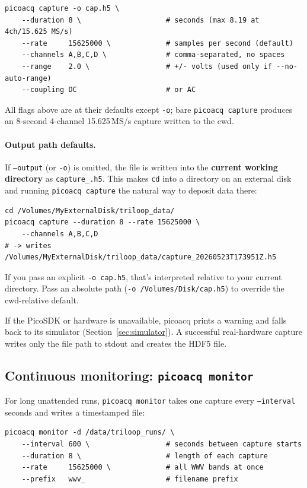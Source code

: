 \documentclass[11pt]{article}
\begin{document}
\begin{lstlisting}[style=shell]
picoacq capture -o cap.h5 \
    --duration 8 \                    # seconds (max 8.19 at 4ch/15.625 MS/s)
    --rate     15625000 \             # samples per second (default)
    --channels A,B,C,D \              # comma-separated, no spaces
    --range    2.0 \                  # +/- volts (used only if --no-auto-range)
    --coupling DC                     # or AC
\end{lstlisting}

All flags above are at their defaults except \texttt{-o}; bare
\texttt{picoacq capture} produces an 8-second 4-channel
15.625\,MS/s capture written to the cwd.

\paragraph{Output path defaults.}  If \texttt{--output} (or \texttt{-o})
is omitted, the file is written into the \textbf{current working
directory} as \texttt{capture\_<UTC-timestamp>.h5}.  This makes
\texttt{cd} into a directory on an external disk and running
\texttt{picoacq capture} the natural way to deposit data there:

\begin{lstlisting}[style=shell]
cd /Volumes/MyExternalDisk/triloop_data/
picoacq capture --duration 8 --rate 15625000 \
    --channels A,B,C,D
# -> writes /Volumes/MyExternalDisk/triloop_data/capture_20260523T173951Z.h5
\end{lstlisting}

If you pass an explicit \texttt{-o cap.h5}, that's interpreted relative
to your current directory.  Pass an absolute path
(\texttt{-o /Volumes/Disk/cap.h5}) to override the cwd-relative
default.

If the PicoSDK or hardware is unavailable, \textsf{picoacq} prints a
warning and falls back to its simulator (Section~\ref{sec:simulator}).
A successful real-hardware capture writes only the file path to stdout
and creates the HDF5 file.

\subsection{Continuous monitoring: \texttt{picoacq monitor}}

For long unattended runs, \texttt{picoacq monitor} takes one capture
every \texttt{--interval} seconds and writes a timestamped file:

\begin{lstlisting}[style=shell]
picoacq monitor -d /data/triloop_runs/ \
    --interval 600 \                  # seconds between capture starts
    --duration 8 \                    # length of each capture
    --rate     15625000 \             # all WWV bands at once
    --prefix   wwv_                   # filename prefix
\end{lstlisting}
\end{document}
